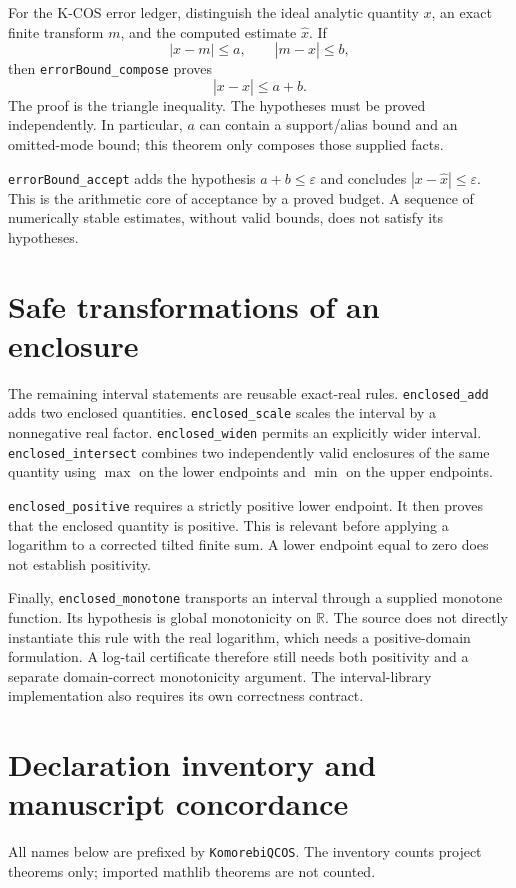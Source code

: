 \documentclass[11pt]{article}
\newcommand{\decl}[1]{\nolinkurl{#1}}
\newcommand{\R}{\mathbb R}
\begin{document}
For the K-COS error ledger, distinguish the ideal analytic quantity $x$, an
exact finite transform $m$, and the computed estimate $\widehat x$. If
\[
 |x-m|\le a,\qquad |m-\widehat x|\le b,
\]
then \decl{errorBound_compose} proves
\[
 |x-\widehat x|\le a+b.
\]
The proof is the triangle inequality. The hypotheses must be proved
independently. In particular, $a$ can contain a support/alias bound and an
omitted-mode bound; this theorem only composes those supplied facts.

\decl{errorBound_accept} adds the hypothesis $a+b\le\varepsilon$ and concludes
$|x-\widehat x|\le\varepsilon$. This is the arithmetic core of acceptance by a
proved budget. A sequence of numerically stable estimates, without valid
bounds, does not satisfy its hypotheses.

\section{Safe transformations of an enclosure}

The remaining interval statements are reusable exact-real rules.
\decl{enclosed_add} adds two enclosed quantities.
\decl{enclosed_scale} scales the interval by a nonnegative real factor.
\decl{enclosed_widen} permits an explicitly wider interval.
\decl{enclosed_intersect} combines two independently valid enclosures of the
same quantity using $\max$ on the lower endpoints and $\min$ on the upper
endpoints.

\decl{enclosed_positive} requires a strictly positive lower endpoint. It then
proves that the enclosed quantity is positive. This is relevant before
applying a logarithm to a corrected tilted finite sum. A lower endpoint equal
to zero does not establish positivity.

Finally, \decl{enclosed_monotone} transports an interval through a supplied
monotone function. Its hypothesis is global monotonicity on $\R$. The source
does not directly instantiate this rule with the real logarithm, which needs
a positive-domain formulation. A log-tail certificate therefore still needs
both positivity and a separate domain-correct monotonicity argument. The
interval-library implementation also requires its own correctness contract.

\section{Declaration inventory and manuscript concordance}

All names below are prefixed by \decl{KomorebiQCOS}. The inventory counts
project theorems only; imported mathlib theorems are not counted.
\end{document}
